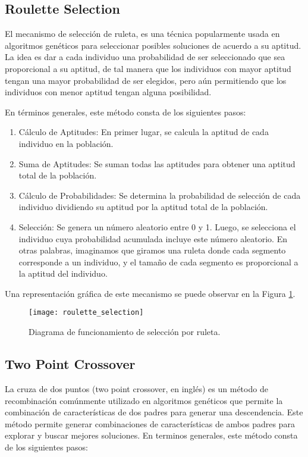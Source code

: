 \subsection{Roulette Selection}
El mecanismo de selección de ruleta, es una técnica popularmente usada en algoritmos genéticos para seleccionar posibles soluciones de acuerdo a su aptitud. La idea es dar a cada individuo una probabilidad de ser seleccionado que sea proporcional a su aptitud, de tal manera que los individuos con mayor aptitud tengan una mayor probabilidad de ser elegidos, pero aún permitiendo que los individuos con menor aptitud tengan alguna posibilidad.

En términos generales, este método consta de los siguientes pasos:

\begin{enumerate}
	\item Cálculo de Aptitudes: En primer lugar, se calcula la aptitud de cada individuo en la población.
	\item Suma de Aptitudes: Se suman todas las aptitudes para obtener una aptitud total de la población.
	\item Cálculo de Probabilidades: Se determina la probabilidad de selección de cada individuo dividiendo su aptitud por la aptitud total de la población.
	\item Selección: Se genera un número aleatorio entre 0 y 1. Luego, se selecciona el individuo cuya probabilidad acumulada incluye este número aleatorio. En otras palabras, imaginamos que giramos una ruleta donde cada segmento corresponde a un individuo, y el tamaño de cada segmento es proporcional a la aptitud del individuo.
\end{enumerate}

Una representación gráfica de este mecanismo se puede observar en la Figura \ref{fig:RS}.

\begin{figure}[htbp]
	\centering
	\texttt{[image: roulette\_selection]}
	\caption{Diagrama de funcionamiento de selección por ruleta.}
	\label{fig:RS}
\end{figure}


\subsection{Two Point Crossover}
La cruza de dos puntos (two point crossover, en inglés) es un método de recombinación comúnmente utilizado en algoritmos genéticos que permite la combinación de características de dos padres para generar una descendencia. Este método permite generar combinaciones de características de ambos padres para explorar y buscar mejores soluciones. En terminos generales, este método consta de los siguientes pasos:

